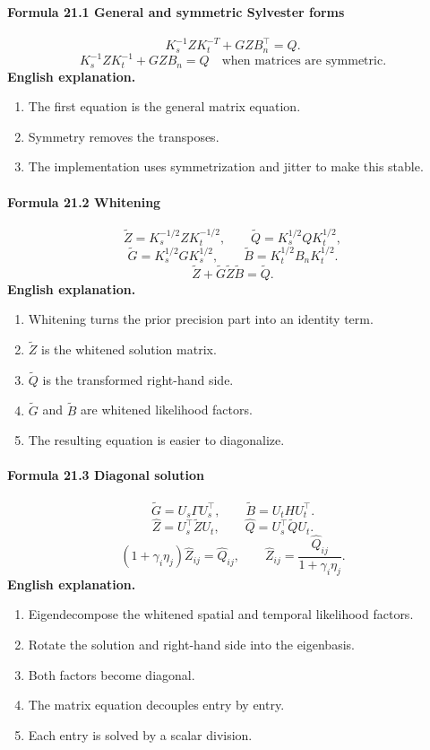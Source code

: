 \documentclass[12pt]{article}
\begin{document}
\paragraph{Formula 21.1 General and symmetric Sylvester forms}
\[
K_s^{-1}ZK_t^{-T}+GZB_n^\top=Q.
\]
\[
K_s^{-1}ZK_t^{-1}+GZB_n=Q
\quad\text{when matrices are symmetric.}
\]
\textbf{English explanation.}
\begin{enumerate}[leftmargin=2em]
\item The first equation is the general matrix equation.
\item Symmetry removes the transposes.
\item The implementation uses symmetrization and jitter to make this stable.
\end{enumerate}

\paragraph{Formula 21.2 Whitening}
\[
\widetilde Z=K_s^{-1/2}ZK_t^{-1/2},
\qquad
\widetilde Q=K_s^{1/2}QK_t^{1/2},
\]
\[
\widetilde G=K_s^{1/2}GK_s^{1/2},
\qquad
\widetilde B=K_t^{1/2}B_nK_t^{1/2}.
\]
\[
\widetilde Z+\widetilde G\widetilde Z\widetilde B=\widetilde Q.
\]
\textbf{English explanation.}
\begin{enumerate}[leftmargin=2em]
\item Whitening turns the prior precision part into an identity term.
\item \(\widetilde Z\) is the whitened solution matrix.
\item \(\widetilde Q\) is the transformed right-hand side.
\item \(\widetilde G\) and \(\widetilde B\) are whitened likelihood factors.
\item The resulting equation is easier to diagonalize.
\end{enumerate}

\paragraph{Formula 21.3 Diagonal solution}
\[
\widetilde G=U_s\Gamma U_s^\top,
\qquad
\widetilde B=U_tHU_t^\top.
\]
\[
\widehat Z=U_s^\top\widetilde ZU_t,
\qquad
\widehat Q=U_s^\top\widetilde QU_t.
\]
\[
(1+\gamma_i\eta_j)\widehat Z_{ij}=\widehat Q_{ij},
\qquad
\widehat Z_{ij}=\frac{\widehat Q_{ij}}{1+\gamma_i\eta_j}.
\]
\textbf{English explanation.}
\begin{enumerate}[leftmargin=2em]
\item Eigendecompose the whitened spatial and temporal likelihood factors.
\item Rotate the solution and right-hand side into the eigenbasis.
\item Both factors become diagonal.
\item The matrix equation decouples entry by entry.
\item Each entry is solved by a scalar division.
\end{enumerate}
\end{document}
